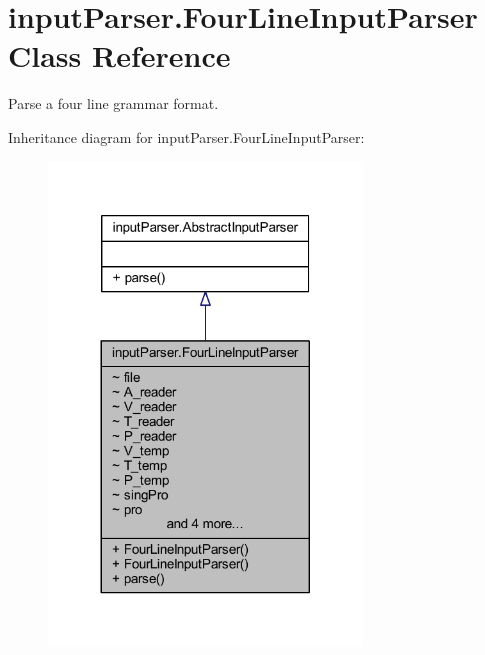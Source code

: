 \hypertarget{classinput_parser_1_1_four_line_input_parser}{\section{input\-Parser.\-Four\-Line\-Input\-Parser Class Reference}
\label{classinput_parser_1_1_four_line_input_parser}
}


Parse a four line grammar format.  




Inheritance diagram for input\-Parser.\-Four\-Line\-Input\-Parser\-:\nopagebreak
\begin{figure}[H]
\begin{center}
\leavevmode
\includegraphics[width=236pt]{classinput_parser_1_1_four_line_input_parser__inherit__graph}
\end{center}
\end{figure}


